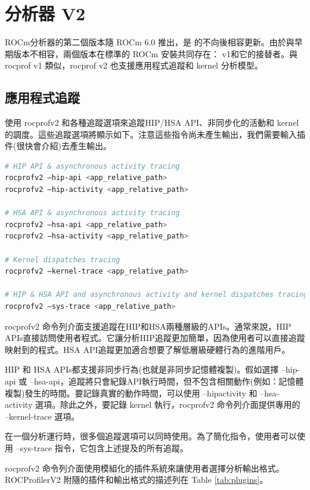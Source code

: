 \section{ 分析器 V2}

ROCm分析器的第二個版本隨 ROCm 6.0 推出，是  的不向後相容更新。由於與早期版本不相容，兩個版本在標準的 ROCm 安裝共同存在： v1和它的接替者。與 rocprof v1 類似，rocprof v2 也支援應用程式追蹤和 kernel 分析模型。

\subsection{應用程式追蹤}

使用 rocprofv2 和各種追蹤選項來追蹤HIP/HSA API、非同步化的活動和 kernel 的調度。這些追蹤選項將顯示如下。注意這些指令尚未產生輸出，我們需要輸入插件(很快會介紹)去產生輸出。

\begin{lstlisting}[language=bash, caption={使用rocprofv2應用程式追蹤功能要使用的指令}, label={lst:trace feature of rocprofv2}]
# HIP API & asynchronous activity tracing
rocprofv2 –hip-api <app_relative_path>
rocprofv2 –hip-activity <app_relative_path>

# HSA API & asynchronous activity tracing
rocprofv2 –hsa-api <app_relative_path>
rocprofv2 –hsa-activity <app_relative_path>

# Kernel dispatches tracing
rocprofv2 –kernel-trace <app_relative_path>

# HIP & HSA API and asynchronous activity and kernel dispatches tracing
rocprofv2 –sys-trace <app_relative_path>
\end{lstlisting}

rocprofv2 命令列介面支援追蹤在HIP和HSA兩種層級的APIs。通常來說，HIP APIs直接訪問使用者程式。它讓分析HIP追蹤更加簡單，因為使用者可以直接追蹤映射到的程式。HSA API追蹤更加適合想要了解低層級硬體行為的進階用戶。

HIP 和 HSA APIs都支援非同步行為(也就是非同步記憶體複製)。假如選擇 –hip-api 或 –hsa-api，追蹤將只會紀錄API執行時間，但不包含相關動作(例如：記憶體複製)發生的時間。要記錄真實的動作時間，可以使用 –hipactivity 和 –hsa-activity 選項。除此之外，要記錄 kernel 執行，rocprofv2 命令列介面提供專用的 –kernel-trace 選項。

在一個分析運行時，很多個追蹤選項可以同時使用。為了簡化指令，使用者可以使用 –sys-trace 指令，它包含上述提及的所有追蹤。

rocprofv2 命令列介面使用模組化的插件系統來讓使用者選擇分析輸出格式。ROCProfilerV2 附隨的插件和輸出格式的描述列在 Table \ref{tab:plugins}。

